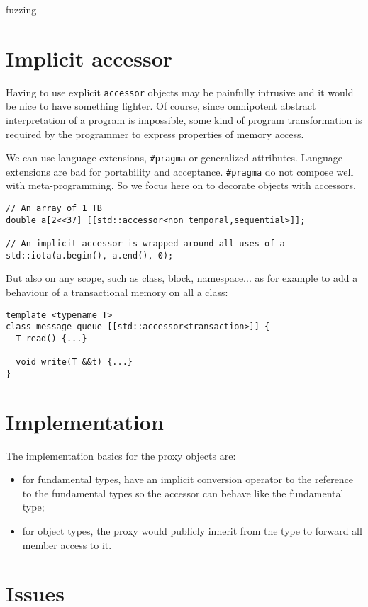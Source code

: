 \documentclass[a4paper]{article}
\begin{document}
fuzzing


\section{Implicit accessor}
\label{sec:implicit-accessor}

Having to use explicit \texttt{accessor} objects may be painfully
intrusive and it would be nice to have something lighter. Of course,
since omnipotent abstract interpretation of a program is impossible,
some kind of program transformation is required by the programmer to
express properties of memory access.

We can use language extensions, \lstinline|#pragma| or generalized
attributes. Language extensions are bad for portability and
acceptance. \lstinline|#pragma| do not compose well with
meta-programming. So we focus here on to decorate objects with
accessors.

\begin{lstlisting}
// An array of 1 TB
double a[2<<37] [[std::accessor<non_temporal,sequential>]];

// An implicit accessor is wrapped around all uses of a
std::iota(a.begin(), a.end(), 0);
\end{lstlisting}

But also on any scope, such as class, block, namespace... as for
example to add a behaviour of a transactional memory on all a class:
\begin{lstlisting}
template <typename T>
class message_queue [[std::accessor<transaction>]] {
  T read() {...}

  void write(T &&t) {...}
}
\end{lstlisting}


\section{Implementation}
\label{sec:implementation}

The implementation basics for the proxy objects are:
\begin{itemize}
\item for fundamental types, have an implicit conversion operator to
  the reference to the fundamental types so the accessor can behave
  like the fundamental type;
\item for object types, the proxy would publicly inherit from the type to
  forward all member access to it.
\end{itemize}


\section{Issues}
\label{sec:issues}
\end{document}
